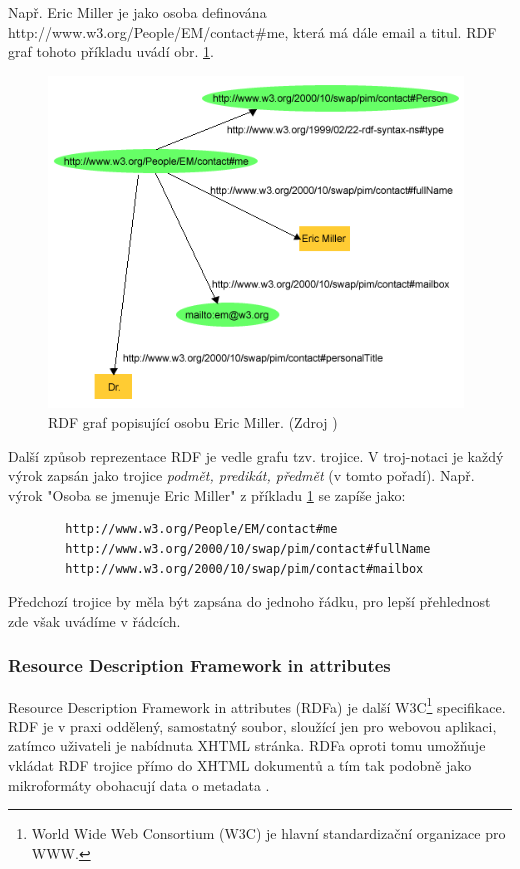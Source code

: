         Např. Eric Miller je jako osoba definována http://www.w3.org/People/EM/contact\#me, která má dále email a titul. RDF graf tohoto příkladu uvádí obr. \ref{img:miller}.
        
        \begin{figure}[h]
        \begin{center}
        \includegraphics[width=11cm]{figures/rdf}
        \caption{RDF graf popisující osobu Eric Miller. (Zdroj \cite{RDFprimer})}
        \label{img:miller}
        \end{center}
        \end{figure}

        Další způsob reprezentace RDF je vedle grafu tzv. trojice. V troj-notaci je každý výrok zapsán jako trojice \textit{podmět, predikát, předmět} (v tomto pořadí). 
        Např. výrok "Osoba se jmenuje Eric Miller" z příkladu \ref{img:miller} se zapíše jako:
        
        \begin{verbatim}
        http://www.w3.org/People/EM/contact#me 
        http://www.w3.org/2000/10/swap/pim/contact#fullName 
        http://www.w3.org/2000/10/swap/pim/contact#mailbox
        \end{verbatim}
        Předchozí trojice by měla být zapsána do jednoho řádku, pro lepší přehlednost zde však uvádíme v řádcích.
        
        \subsubsection{Resource Description Framework in attributes} 
        \label{chapter:rdfa}
        
        Resource Description Framework in attributes (RDFa) je další W3C\footnote{World Wide Web Consortium (W3C) je hlavní standardizační organizace pro WWW.} specifikace.
        RDF je v praxi oddělený, samostatný soubor, sloužící jen pro webovou aplikaci, zatímco uživateli je nabídnuta XHTML stránka. 
        RDFa oproti tomu umožňuje vkládat RDF trojice přímo do XHTML dokumentů a tím tak podobně jako mikroformáty obohacují data o metadata \cite{RDFa}.
        
